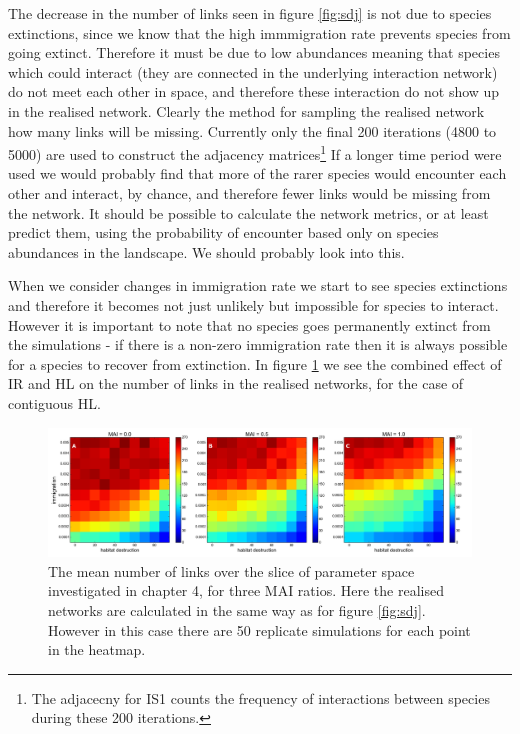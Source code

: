 The decrease in the number of links seen in figure \ref{fig:sdj} is not due to species extinctions, since we know that the high immmigration rate prevents species from going extinct. Therefore it must be due to low abundances meaning that species which could interact (they are connected in the underlying interaction network) do not meet each other in space, and therefore these interaction do not show up in the realised network. Clearly the method for sampling the realised network how many links will be missing. Currently only the final 200 iterations (4800 to 5000) are used to construct the adjacency matrices\footnote{The adjacecny for IS1 counts the frequency of interactions between species during these 200 iterations.} If a longer time period were used we would probably find that more of the rarer species would encounter each other and interact, by chance, and therefore fewer links would be missing from the network. It should be possible to calculate the network metrics, or at least predict them, using the probability of encounter based only on species abundances in the landscape. We should probably look into this.

When we consider changes in immigration rate we start to see species extinctions and therefore it becomes not just unlikely but impossible for species to interact. However it is important to note that no species goes permanently extinct from the simulations - if there is a non-zero immigration rate then it is always possible for a species to recover from extinction. In figure \ref{fig:numlinks_heatmaps} we see the combined effect of IR and HL on the number of links in the realised networks, for the case of contiguous HL. 

\begin{figure}
	\centering
	\includegraphics[width=\textwidth]{"numlinks_ir_v_hl"}
	\caption{The mean number of links over the slice of parameter space investigated in chapter 4, for three MAI ratios. Here the realised networks are calculated in the same way as for figure \ref{fig:sdj}. However in this case there are 50 replicate simulations for each point in the heatmap.}
	\label{fig:numlinks_heatmaps}
\end{figure}


